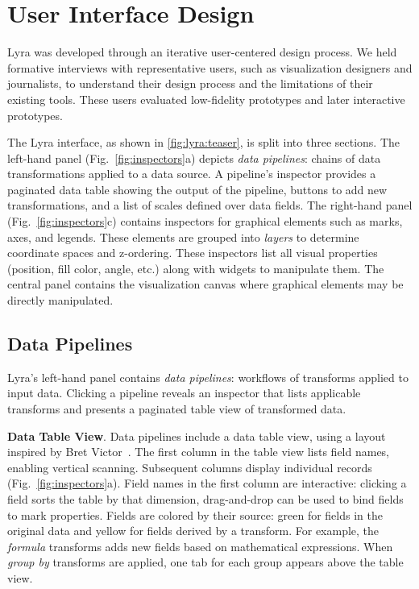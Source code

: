 \section{User Interface Design}

Lyra was developed through an iterative user-centered design process. We held
formative interviews with representative users, such as visualization designers
and journalists, to understand their design process and the limitations of their
existing tools. These users evaluated low-fidelity prototypes and later
interactive prototypes.

The Lyra interface, as shown in \cref{fig:lyra:teaser}, is split into three
sections. The left-hand panel (Fig.~\ref{fig:inspectors}a) depicts \emph{data
pipelines}: chains of data transformations applied to a data source. A
pipeline's inspector provides a paginated data table showing the output of the
pipeline, buttons to add new transformations, and a list of scales defined over
data fields. The right-hand panel (Fig.~\ref{fig:inspectors}c) contains
inspectors for graphical elements such as marks, axes, and legends. These
elements are grouped into \emph{layers} to determine coordinate spaces and
z-ordering. These inspectors list all visual properties (position, fill color,
angle, etc.) along with widgets to manipulate them. The central panel contains
the visualization canvas where graphical elements may be directly manipulated.

\subsection{Data Pipelines}

Lyra's left-hand panel contains \emph{data pipelines}: workflows of transforms
applied to input data. Clicking a pipeline reveals an inspector that lists
applicable transforms and presents a paginated table view of transformed data.

\textbf{Data Table View}. Data pipelines include a data table view, using a
layout inspired by Bret Victor~\cite{victor:drawing}. The first column in the
table view lists field names, enabling vertical scanning. Subsequent columns
display individual records (Fig.~\ref{fig:inspectors}a). Field names in the
first column are interactive: clicking a field sorts the table by that
dimension, drag-and-drop can be used to bind fields to mark properties. Fields
are colored by their source: green for fields in the original data and yellow
for fields derived by a transform. For example, the \emph{formula} transforms
adds new fields based on mathematical expressions. When \emph{group by}
transforms are applied, one tab for each group appears above the table view.

